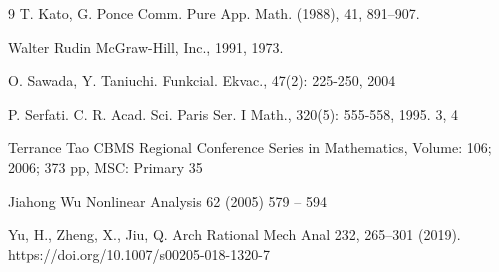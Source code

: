 \documentclass[12pt,xcolor=svgnames]{amsart}
\begin{document}
\begin{thebibliography}{9}
 T. Kato, G. Ponce
 \newblock Comm.
Pure App. Math. (1988), 41, 891–907.

Walter Rudin
\newblock McGraw-Hill, Inc., 1991, 1973.

O. Sawada, Y. Taniuchi. 
\newblock Funkcial. Ekvac., 47(2): 225-250, 2004

 P. Serfati.
\newblock C. R. Acad. Sci. Paris Ser. I Math., 320(5): 555-558, 1995. 3, 4

 Terrance Tao
\newblock CBMS Regional Conference Series in Mathematics, Volume: 106; 2006; 373 pp, MSC: Primary 35

Jiahong Wu
\newblock Nonlinear Analysis 62 (2005) 579 – 594

Yu, H., Zheng, X.,  Jiu, Q. 
\newblock Arch Rational Mech Anal 232, 265–301 (2019). https://doi.org/10.1007/s00205-018-1320-7




\end{thebibliography}
\end{document}
